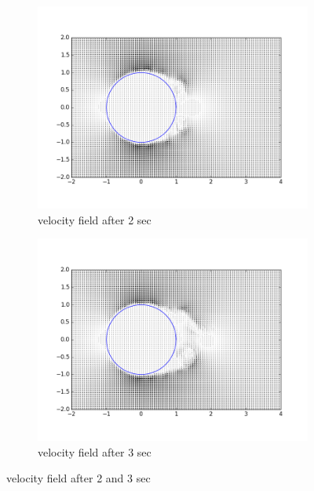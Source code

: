 \documentclass[a4paper,11pt]{article}
\begin{document}
\begin{figure}[ht]
  \centering
  \begin{subfigure}[ht]{.5\textwidth}
      \centering
      \includegraphics[width=.8\linewidth]{qui_2.png}
      \caption{velocity field after 2 sec}
      \label{fig:161}
  \end{subfigure}
  \begin{subfigure}[ht]{.5\textwidth}
      \centering
      \includegraphics[width=.8\linewidth]{qui_3.png}
      \caption{velocity field after 3 sec}
      \label{fig:251}
  \end{subfigure}%
  \label{fig:Question 1a1}
  \caption{velocity field after 2 and 3 sec}
\end{figure}
\end{document}
